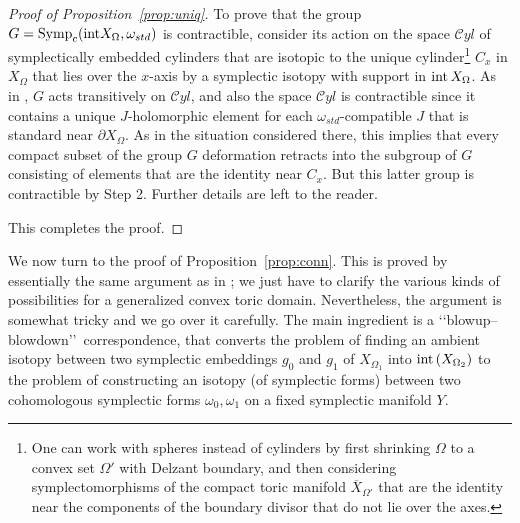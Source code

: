 \documentclass[11pt, reqno]{amsart}
\theoremstyle{remark}
\numberwithin{equation}{subsection}
\numberwithin{figure}{section}
\theoremstyle{customremark}
\newcommand{\intt}{{\rm int}}
\newcommand{\ov}{\overline}
\newcommand{\Om}{{\Omega}}
\newcommand{\om}{{\omega}}
\newcommand{\p}{{\partial}}
\newcommand{\MS}{{\medskip}}
\begin{document}
\begin{proof}[Proof of Proposition~\ref{prop:uniq}]
To prove that the group $G={ \rm Symp}_c(\intt X_\Om, \om_{std})$ is  contractible,  consider its action on the space ${\mathcal  Cyl}$ of symplectically embedded cylinders that are isotopic to the unique cylinder\footnote
{One can work with  spheres instead of cylinders by first shrinking $\Om$ to a convex set $\Om'$ with Delzant boundary, and then considering symplectomorphisms of the compact toric manifold $\ov X_{\Om'}$ that are the identity near the components of the boundary divisor that do not lie over the axes.}
 $C_x$ in $X_\Om$ that lies over the $x$-axis by a symplectic isotopy with support in $\intt\,  X_\Om$.  As in \cite[Ch.9.5]{JHOL}, $G$ acts transitively on ${\mathcal Cyl}$, and also the space ${\mathcal Cyl}$ is  contractible since it contains a unique $J$-holomorphic element  for  each $\om_{std}$-compatible $J$ that is standard near $\p X_\Om$. As in the situation considered there, this
implies that every compact subset of the group $G$ deformation retracts into the subgroup of $G$  consisting of elements that are the identity near $C_x$.
But this latter group is contractible by Step 2.   Further details are left to the reader.
\MS

This completes the proof.
 \end{proof}


We now turn to the proof of Proposition~\ref{prop:conn}.
This is proved by essentially the same argument as in \cite{CG}; we just have to clarify the various kinds of possibilities for a generalized  convex toric domain.   Nevertheless, the argument is somewhat tricky and we go over it carefully. 
The main ingredient is a \lq\lq blowup--blowdown\rq\rq \, correspondence, that converts the
problem of finding an ambient isotopy between two  symplectic  embeddings 
$g_0$ and $g_1$  of $X_{\Omega_1}$ into $\intt\, (X_{\Omega_2})$ to
the problem of constructing an isotopy (of symplectic forms) between two cohomologous symplectic forms $\om_0, \om_1$ on 
a fixed symplectic manifold $Y$.  
\end{document}
